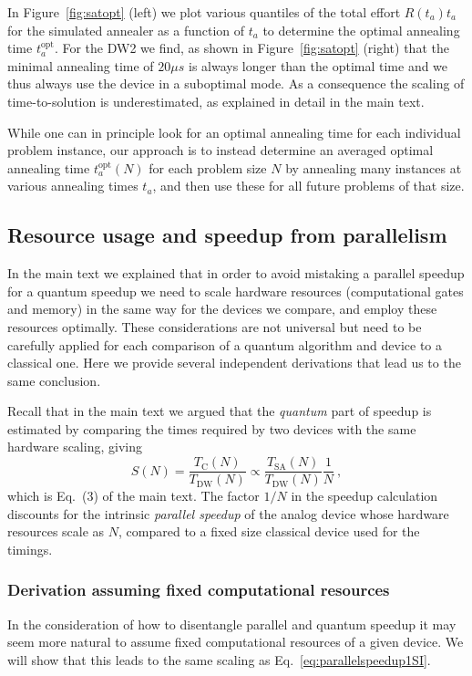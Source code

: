 In Figure~\ref{fig:satopt} (left) we plot various quantiles of the total effort $R(t_a)t_a$ for the simulated annealer as a function of $t_a$ to determine the  optimal annealing time $t_a^{\textrm{opt}}$. For the DW2 we find, as shown in Figure~\ref{fig:satopt} (right) that the minimal annealing time of  $20\mu s$  is always longer than the optimal time and we thus always use the device in a suboptimal mode. As a consequence the scaling of time-to-solution is underestimated, as explained in detail in the main text.

While one can in principle look for an optimal annealing time for each individual problem instance, our approach is to instead determine an averaged optimal annealing time $t_a^{\textrm{opt}}(N)$ for each problem size $N$ by annealing many instances at various annealing times $t_a$, and then use these for all future problems of that size.\\


\subsection{Resource usage and speedup from parallelism}

In the main text we explained that in order to avoid mistaking a parallel speedup for a quantum speedup we need to scale hardware resources  (computational gates and memory) in the same way for the devices we compare, and employ these resources optimally. These considerations are not universal but need to be carefully applied for each comparison of a quantum algorithm and device to a classical one. Here we provide several independent derivations that lead us to the same conclusion.

Recall that in the main text we argued that the {\em quantum} part of speedup is estimated by comparing the times required by two devices with the same hardware scaling, giving
%
\begin{equation}
S(N) = \frac{T_{\textrm{C}}(N)}{T_{\textrm{DW}}(N)} \propto  \frac{T_{\textrm{SA}}(N)}{T_{\textrm{DW}}(N)} \frac{1}{N}\ ,
\label{eq:parallelspeedup1SI}
\end{equation}
%
which is Eq.~(3) of the main text. The factor $1/N$ in the speedup calculation discounts for the intrinsic \emph{parallel speedup} of the analog device whose hardware resources scale as $N$, compared to a fixed size classical device used for the timings.

\subsubsection{Derivation assuming fixed computational resources}
In the consideration of how to disentangle parallel and quantum speedup it may seem more natural to assume fixed computational resources of a given device. We will show that this leads to the same scaling as Eq.~\eqref{eq:parallelspeedup1SI}.

